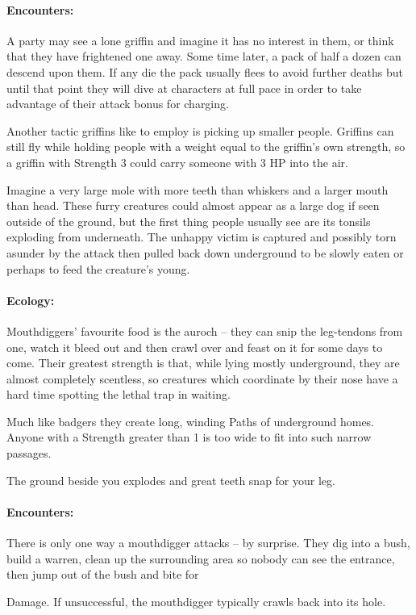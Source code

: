 \begin{multicols}{2}
\paragraph{Encounters:} A party may see a lone griffin and imagine it has no interest in them, or think that they have frightened one away.
Some time later, a pack of half a dozen can descend upon them.
If any die the pack usually flees to avoid further deaths but until that point they will dive at characters at full pace in order to take advantage of their attack bonus for charging.

Another tactic griffins like to employ is picking up smaller people.  Griffins can still fly while holding people with a weight equal to the griffin's own strength, so a griffin with Strength 3 could carry someone with 3 HP into the air.

\label{mouthdigger}

Imagine a very large mole with more teeth than whiskers and a larger mouth than head.  These furry creatures could almost appear as a large dog if seen outside of the ground, but the first thing people usually see are its tonsils exploding from underneath.  The unhappy victim is captured and possibly torn asunder by the attack then pulled back down underground to be slowly eaten or perhaps to feed the creature's young.

\paragraph{Ecology:} Mouthdiggers' favourite food is the auroch -- they can snip the leg-tendons from one, watch it bleed out and then crawl over and feast on it for some days to come.
Their greatest strength is that, while lying mostly underground, they are almost completely scentless, so creatures which coordinate by their nose have a hard time spotting the lethal trap in waiting.

Much like badgers they create long, winding Paths of underground homes.  Anyone with a Strength greater than 1 is too wide to fit into such narrow passages.

\begin{boxtext}

	The ground beside you explodes and great teeth snap for your leg.

\end{boxtext}

\paragraph{Encounters:} There is only one way a mouthdigger attacks -- by surprise.  They dig into a bush, build a warren, clean up the surrounding area so nobody can see the entrance, then jump out of the bush and bite for \addtocounter{strb}{-5} Damage.  If unsuccessful, the mouthdigger typically crawls back into its hole.


\end{multicols}
